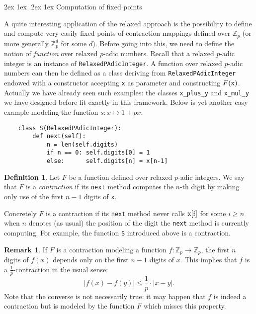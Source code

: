 \documentclass[11pt]{article}
\makeatletter
\numberwithin{equation}{section}
\numberwithin{figure}{section}
\renewcommand\paragraph{\@startsection{paragraph}{4}{\z@}%
                                    {2ex \@plus1ex \@minus.2ex}%
                                    {1ex}%
                                    {\normalfont\normalsize\bfseries}}
\renewcommand{\leq}{\leqslant}
\renewcommand{\geq}{\geqslant}
\theoremstyle{definition}
\newtheorem{deftn}[theo]{Definition}
\newtheorem{rem}[theo]{Remark}
\newcommand{\Z}{\mathbb Z}
\newcommand{\Zp}{\Z_p}
\newcommand{\ttx}{\texttt{\rm x}\xspace}
\makeatother
\begin{document}
\paragraph{Computation of fixed points}

A quite interesting application of the relaxed approach is the 
possibility to define and compute very easily fixed points of 
contraction mappings defined over $\Zp$ (or more generally $\Zp^d$ for 
some $d$). Before going into this, we need to define the notion of
\emph{function} over relaxed $p$-adic numbers. 
Recall that a relaxed $p$-adic integer is an instance of 
\texttt{RelaxedPAdicInteger}. A function over relaxed $p$-adic numbers 
can then be defined as a class deriving from 
\texttt{RelaxedPAdicInteger} endowed with a constructor accepting \ttx 
as parameter and constructing $F(\ttx)$. Actually we have already seen
such examples: the classes \texttt{x\_plus\_y} and \texttt{x\_mul\_y}
we have designed before fit exactly in this framework.
Below is yet another easy example modeling the function $s : x \mapsto 
1 + px$.

\begin{lstlisting}
    class S(RelaxedPAdicInteger):
        def next(self):
            n = len(self.digits)
            if n == 0: self.digits[0] = 1
            else:      self.digits[n] = x[n-1]
\end{lstlisting}

\begin{deftn}
Let $F$ be a function defined over relaxed $p$-adic integers.
We say that $F$ is a \emph{contraction} if its \texttt{next} method 
computes the $n$-th digit by making only use of the first $n{-}1$ digits 
of \ttx.
\end{deftn}

\noindent
Concretely $F$ is a contraction if its \texttt{next} method never
calls $\ttx[i]$ for some $i \geq n$ when $n$ denotes (as usual) the 
position of the digit the \texttt{next} method is currently computing.
For example, the function \texttt{S} introduced above is a contraction.

\begin{rem}
If $F$ is a contraction modeling a function $f : \Zp \to \Zp$,
the first $n$ digits of $f(x)$ depends only on the first $n{-}1$ digits
of $x$. This implies that $f$ is a $\frac 1 p$-contraction in the 
usual sense:
$$\textstyle 
|f(x) - f(y)| \leq \frac 1 p \cdot |x-y|.$$
Note that the converse is not necessarily true: it may happen that $f$
is indeed a contraction but is modeled by the function $F$ which misses
this property.
\end{rem}
\end{document}

